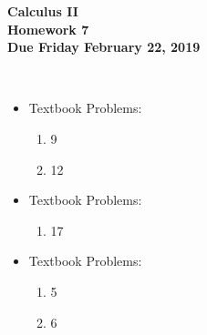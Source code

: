 \documentclass[12pt]{article}
\begin{document}
\pagestyle{empty}
 
\begin{center}
{\large {\bf Calculus II}}\\
\medskip
{\large {\bf Homework 7}}\\
\medskip
{ {\bf Due Friday February 22, 2019}}\\
\end{center}

 \\ 



\begin{itemize}
\setlength{\itemsep}{0mm}
\item Textbook Problems:
  \begin{enumerate}
  \setlength{\itemsep}{-1mm}
    \item 9
    \item 12
  \end{enumerate}
\end{itemize}


\begin{itemize}
\setlength{\itemsep}{0mm}
\item Textbook Problems:
  \begin{enumerate}
  \setlength{\itemsep}{-1mm}
    \item 17
  \end{enumerate}
\end{itemize}



\begin{itemize}
\setlength{\itemsep}{0mm}
\item Textbook Problems:
  \begin{enumerate}
  \setlength{\itemsep}{-1mm}
    \item 5
    \item 6
  \end{enumerate}
\end{itemize}
\end{document}
